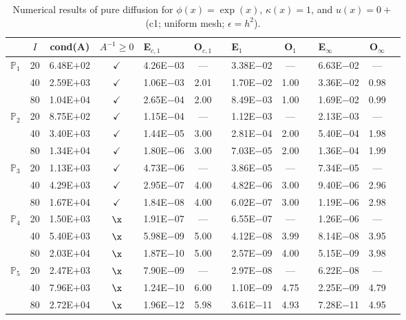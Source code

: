 \begin{table}[H]
\centering
\caption{Numerical results of pure diffusion for $\phi(x)=\exp(x)$, $\kappa(x)=1$, and $u(x)=0+$ (c1; uniform mesh; $\epsilon=h^2$).}
\begin{tabular}{@{}l c c c l c c l c c l c c@{}}
\toprule
 & $I$ & cond(A) & $A^{-1}\geq 0$ &  E$_{c,1}$ & O$_{c,1}$ && E$_1$ & O$_1$ && E$_{\infty}$ & O$_{\infty}$\\
\midrule
\multirow{3}{*}{$\mathbb{P}_{1}$}
 & 20 & 6.48E$+$02 & $\checkmark$ & 4.26E$-$03 & --- && 3.38E$-$02 & --- && 6.63E$-$02 & ---\\
 & 40 & 2.59E$+$03 & $\checkmark$ & 1.06E$-$03 & 2.01 && 1.70E$-$02 & 1.00 && 3.36E$-$02 & 0.98\\
 & 80 & 1.04E$+$04 & $\checkmark$ & 2.65E$-$04 & 2.00 && 8.49E$-$03 & 1.00 && 1.69E$-$02 & 0.99\\
\midrule
\multirow{3}{*}{$\mathbb{P}_{2}$}
 & 20 & 8.75E$+$02 & $\checkmark$ & 1.15E$-$04 & --- && 1.12E$-$03 & --- && 2.13E$-$03 & ---\\
 & 40 & 3.40E$+$03 & $\checkmark$ & 1.44E$-$05 & 3.00 && 2.81E$-$04 & 2.00 && 5.40E$-$04 & 1.98\\
 & 80 & 1.34E$+$04 & $\checkmark$ & 1.80E$-$06 & 3.00 && 7.03E$-$05 & 2.00 && 1.36E$-$04 & 1.99\\
\midrule
\multirow{3}{*}{$\mathbb{P}_{3}$}
 & 20 & 1.13E$+$03 & $\checkmark$ & 4.73E$-$06 & --- && 3.86E$-$05 & --- && 7.34E$-$05 & ---\\
 & 40 & 4.29E$+$03 & $\checkmark$ & 2.95E$-$07 & 4.00 && 4.82E$-$06 & 3.00 && 9.40E$-$06 & 2.96\\
 & 80 & 1.67E$+$04 & $\checkmark$ & 1.84E$-$08 & 4.00 && 6.02E$-$07 & 3.00 && 1.19E$-$06 & 2.98\\
\midrule
\multirow{3}{*}{$\mathbb{P}_{4}$}
 & 20 & 1.50E$+$03 & $\x$ & 1.91E$-$07 & --- && 6.55E$-$07 & --- && 1.26E$-$06 & ---\\
 & 40 & 5.40E$+$03 & $\x$ & 5.98E$-$09 & 5.00 && 4.12E$-$08 & 3.99 && 8.14E$-$08 & 3.95\\
 & 80 & 2.03E$+$04 & $\x$ & 1.87E$-$10 & 5.00 && 2.57E$-$09 & 4.00 && 5.15E$-$09 & 3.98\\
\midrule
\multirow{3}{*}{$\mathbb{P}_{5}$}
 & 20 & 2.47E$+$03 & $\x$ & 7.90E$-$09 & --- && 2.97E$-$08 & --- && 6.22E$-$08 & ---\\
 & 40 & 7.96E$+$03 & $\x$ & 1.24E$-$10 & 6.00 && 1.10E$-$09 & 4.75 && 2.25E$-$09 & 4.79\\
 & 80 & 2.72E$+$04 & $\x$ & 1.96E$-$12 & 5.98 && 3.61E$-$11 & 4.93 && 7.28E$-$11 & 4.95\\
\bottomrule
\end{tabular}
\end{table}